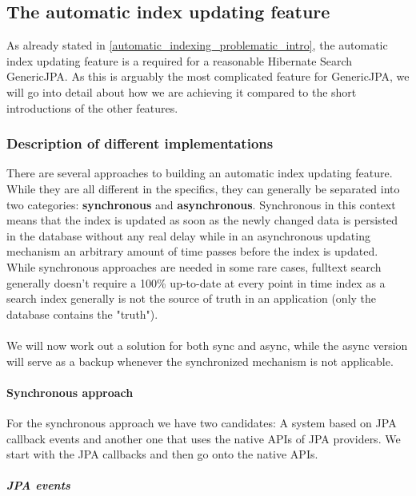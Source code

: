 \subsection{The automatic index updating feature}

As already stated in \ref{automatic_indexing_problematic_intro}, the automatic index updating feature is a required for a reasonable Hibernate Search GenericJPA. As this is arguably the most complicated feature for GenericJPA, we will go into detail about how we are achieving it compared to the short introductions of the other features.

\subsubsection{Description of different implementations} \label{description_of_different_implementations}

There are several approaches to building an automatic index updating feature. While they are all different in the specifics, they can generally be separated into two categories: \textbf{synchronous} and \textbf{asynchronous}. Synchronous in this context means that the index is updated as soon as the newly changed data is persisted in the database without any real delay while in an asynchronous updating mechanism an arbitrary amount of time passes before the index is updated. While synchronous approaches are needed in some rare cases, fulltext search generally doesn't require a 100\% up-to-date at every point in time index as a search index generally is not the source of truth in an application (only the database contains the "truth").
\\\\
We will now work out a solution for both sync and async, while the async version will serve as a backup whenever the synchronized mechanism is not applicable.

\pagebreak

\paragraph{Synchronous approach}

For the synchronous approach we have two candidates: A system based on JPA callback events and another one that uses the native APIs of JPA providers. We start with the JPA callbacks and then go onto the native APIs.

\subparagraph{JPA events}

